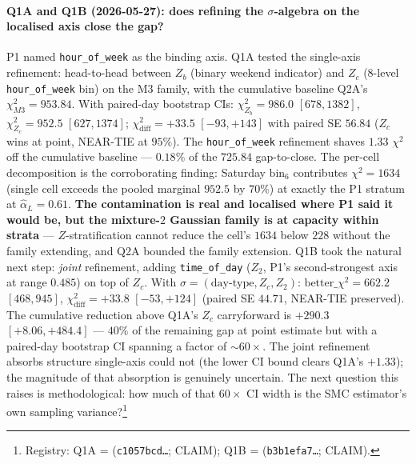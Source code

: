 \paragraph{Q1A and Q1B (2026-05-27): does refining the
$\sigma$-algebra on the localised axis close the gap?} P1 named
\texttt{hour\_of\_week} as the binding axis. Q1A tested the
single-axis refinement: head-to-head between $Z_b$ (binary
weekend indicator) and $Z_c$ ($8$-level \texttt{hour\_of\_week}
bin) on the M3 family, with the cumulative baseline Q2A's
$\chi^{2}_{M3} = 953.84$. With paired-day bootstrap CIs:
$\chi^{2}_{Z_b} = 986.0$ $[678, 1382]$,
$\chi^{2}_{Z_c} = 952.5$ $[627, 1374]$;
$\chi^{2}_{\text{diff}} = +33.5$ $[-93, +143]$ with paired SE
$56.84$ ($Z_c$ wins at point, NEAR-TIE at $95\%$). The
\texttt{hour\_of\_week} refinement shaves $1.33$ $\chi^{2}$ off
the cumulative baseline --- $0.18\%$ of the $725.84$ gap-to-close.
The per-cell decomposition is the corroborating finding:
Saturday $\text{bin}_6$ contributes $\chi^{2} = 1634$ (single
cell exceeds the pooled marginal $952.5$ by $70\%$) at exactly
the P1 stratum at $\hat\alpha_L = 0.61$. \textbf{The contamination
is real and localised where P1 said it would be, but the
mixture-$2$ Gaussian family is at capacity within strata} ---
$Z$-stratification cannot reduce the cell's $1634$ below $228$
without the family extending, and Q2A bounded the family
extension. Q1B took the natural next step: \emph{joint}
refinement, adding \texttt{time\_of\_day} ($Z_2$, P1's
second-strongest axis at range $0.485$) on top of $Z_c$. With
$\sigma = (\text{day-type}, Z_c, Z_2)$:
$\text{better}\_\chi^{2} = 662.2$ $[468, 945]$,
$\chi^{2}_{\text{diff}} = +33.8$ $[-53, +124]$ (paired SE $44.71$,
NEAR-TIE preserved). The cumulative reduction above Q1A's $Z_c$
carryforward is $+290.3$ $[+8.06, +484.4]$ --- $40\%$ of the
remaining gap at point estimate but with a paired-day bootstrap
CI spanning a factor of $\sim 60\times$. The joint refinement
absorbs structure single-axis could not (the lower CI bound clears
Q1A's $+1.33$); the magnitude of that absorption is genuinely
uncertain. The next question this raises is methodological: how
much of that $60\times$ CI width is the SMC estimator's own
sampling variance?\footnote{Registry: Q1A =
(\texttt{c1057bcd\ldots}; CLAIM); Q1B =
(\texttt{b3b1efa7\ldots}; CLAIM).}

